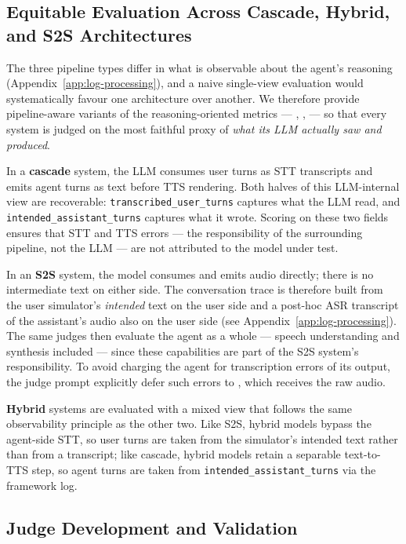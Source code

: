 \subsection{Equitable Evaluation Across Cascade, Hybrid, and S2S Architectures}
\label{app:arch-eval}

The three pipeline types differ in what is observable about the agent's reasoning (Appendix~\ref{app:log-processing}), and a naive single-view evaluation would systematically favour one architecture over another. We therefore provide pipeline-aware variants of the reasoning-oriented metrics --- \metricfaithfulness, \metricconcise, \metricconversationprogression--- so that every system is judged on the most faithful proxy of \emph{what its LLM actually saw and produced}.

In a \textbf{cascade} system, the LLM consumes user turns as STT transcripts and emits agent turns as text before TTS rendering. Both halves of this LLM-internal view are recoverable: \texttt{transcribed\_user\_turns} captures what the LLM read, and \texttt{intended\_assistant\_turns} captures what it wrote. Scoring on these two fields ensures that STT and TTS errors --- the responsibility of the surrounding pipeline, not the LLM --- are not attributed to the model under test.

In an \textbf{S2S} system, the model consumes and emits audio directly; there is no intermediate text on either side. The conversation trace is therefore built from the user simulator's \emph{intended} text on the user side and a post-hoc ASR transcript of the assistant's audio also on the user side (see Appendix~\ref{app:log-processing}). The same judges then evaluate the agent as a whole --- speech understanding and synthesis included --- since these capabilities are part of the S2S system's responsibility. To avoid charging the agent for transcription errors of its output, the judge prompt explicitly defer such errors to \metricfidelity, which receives the raw audio.

\textbf{Hybrid} systems are evaluated with a mixed view that follows the same observability principle as the other two. Like S2S, hybrid models bypass the agent-side STT, so user turns are taken from the simulator's intended text rather than from a transcript; like cascade, hybrid models retain a separable text-to-TTS step, so agent turns are taken from \texttt{intended\_assistant\_turns} via the framework log.


\subsection{Judge Development and Validation}
\label{app:judge-validation}

